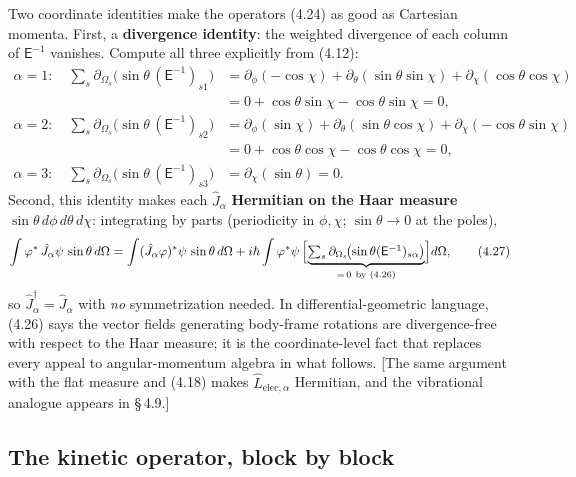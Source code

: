 Two coordinate identities make the operators (4.24) as good as Cartesian momenta. First, a \textbf{divergence identity}: the weighted divergence of each column of $\mathsf E^{-1}$ vanishes. Compute all three explicitly from (4.12):
\begin{equation}
\begin{aligned}
\alpha=1:\quad \sum_s\partial_{\Omega_s}\!\bigl(\sin\theta\,(\mathsf E^{-1})_{s1}\bigr)
&=\partial_\phi(-\cos\chi)+\partial_\theta(\sin\theta\sin\chi)+\partial_\chi(\cos\theta\cos\chi)\\
&=0+\cos\theta\sin\chi-\cos\theta\sin\chi=0,\\
\alpha=2:\quad \sum_s\partial_{\Omega_s}\!\bigl(\sin\theta\,(\mathsf E^{-1})_{s2}\bigr)
&=\partial_\phi(\sin\chi)+\partial_\theta(\sin\theta\cos\chi)+\partial_\chi(-\cos\theta\sin\chi)\\
&=0+\cos\theta\cos\chi-\cos\theta\cos\chi=0,\\
\alpha=3:\quad \sum_s\partial_{\Omega_s}\!\bigl(\sin\theta\,(\mathsf E^{-1})_{s3}\bigr)
&=\partial_\chi(\sin\theta)=0 .
\end{aligned}\tag{4.26}
\end{equation}
Second, this identity makes each $\hat J_\alpha$ \textbf{Hermitian on the Haar measure} $\sin\theta\,d\phi\,d\theta\,d\chi$: integrating by parts (periodicity in $\phi,\chi$; $\sin\theta\to0$ at the poles),
\begin{equation}
\int\varphi^{*}\,\hat J_\alpha\psi\,\sin\theta\,d\Omega
=\int(\hat J_\alpha\varphi)^{*}\psi\,\sin\theta\,d\Omega
+i\hbar\int\varphi^{*}\psi\,\Bigl[\underbrace{\textstyle\sum_s\partial_{\Omega_s}\!\bigl(\sin\theta(\mathsf E^{-1})_{s\alpha}\bigr)}_{=\,0\ \text{by (4.26)}}\Bigr]d\Omega , \tag{4.27}
\end{equation}
so $\hat J_\alpha^{\dagger}=\hat J_\alpha$ with \emph{no} symmetrization needed. In differential-geometric language, (4.26) says the vector fields generating body-frame rotations are divergence-free with respect to the Haar measure; it is the coordinate-level fact that replaces every appeal to angular-momentum algebra in what follows. [The same argument with the flat measure and (4.18) makes $\hat L_{\mathrm{elec},\alpha}$ Hermitian, and the vibrational analogue appears in \S\,4.9.]

\subsection{The kinetic operator, block by block}

